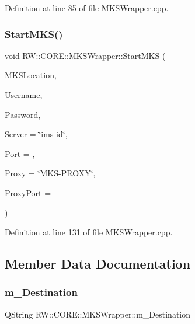 Definition at line 85 of file M\+K\+S\+Wrapper.\+cpp.

\hypertarget{class_r_w_1_1_c_o_r_e_1_1_m_k_s_wrapper_ae6f651398e83b56aca4b9f0da3e417de}{}\label{class_r_w_1_1_c_o_r_e_1_1_m_k_s_wrapper_ae6f651398e83b56aca4b9f0da3e417de} 
\subsubsection{\texorpdfstring{Start\+M\+K\+S()}{StartMKS()}}
{\footnotesize\ttfamily void R\+W\+::\+C\+O\+R\+E\+::\+M\+K\+S\+Wrapper\+::\+Start\+M\+KS (\begin{DoxyParamCaption}\item[{Q\+String}]{M\+K\+S\+Location,  }\item[{Q\+String}]{Username,  }\item[{Q\+String}]{Password,  }\item[{Q\+String}]{Server = {\ttfamily \char`\"{}ims-\/id\char`\"{}},  }\item[{quint16}]{Port = {},  }\item[{Q\+String}]{Proxy = {\ttfamily \char`\"{}MKS-\/PROXY\char`\"{}},  }\item[{quint16}]{Proxy\+Port = {} }\end{DoxyParamCaption})\hspace{0.3cm}{\ttfamily [private]}}



Definition at line 131 of file M\+K\+S\+Wrapper.\+cpp.



\subsection{Member Data Documentation}
\hypertarget{class_r_w_1_1_c_o_r_e_1_1_m_k_s_wrapper_a04dc61f3e323398af1c199e2ff044462}{}\label{class_r_w_1_1_c_o_r_e_1_1_m_k_s_wrapper_a04dc61f3e323398af1c199e2ff044462} 
\subsubsection{\texorpdfstring{m\+\_\+\+Destination}{m\_Destination}}
{\footnotesize\ttfamily Q\+String R\+W\+::\+C\+O\+R\+E\+::\+M\+K\+S\+Wrapper\+::m\+\_\+\+Destination\hspace{0.3cm}{\ttfamily [private]}}



